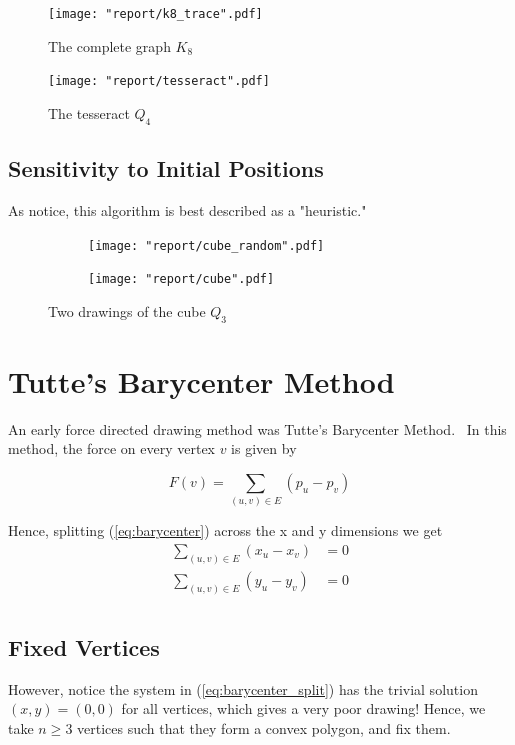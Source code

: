 \documentclass[11pt]{report}
\begin{document}
\begin{figure}[H]
    \centering
    \texttt{[image: "report/k8\_trace".pdf]}
    \caption{The complete graph $K_8$}
\end{figure}

\begin{figure}[H]
    \centering
    \texttt{[image: "report/tesseract".pdf]}
    \caption{The tesseract $Q_4$}
\end{figure}

\subsection{Sensitivity to Initial Positions}
As notice, this algorithm is best described as a "heuristic."   

\begin{figure}[H]
    \begin{subfigure}{.5\linewidth}
    \centering
    \texttt{[image: "report/cube\_random".pdf]}
    \end{subfigure}
    \begin{subfigure}{.5\linewidth}
    \centering
    \texttt{[image: "report/cube".pdf]}
    \end{subfigure}
    \caption{Two drawings of the cube $Q_3$}
\end{figure}

\section{Tutte's Barycenter Method}
An early force directed drawing method was Tutte's Barycenter Method.~\cite{tutte1963draw} In this method, the force on every vertex $v$ is given by 

\begin{equation}\label{eq:barycenter}
F(v) = \sum_{(u, v) \in E} (p_u - p_v)
\end{equation}

Hence, splitting (\ref{eq:barycenter}) across the x and y dimensions we get
\begin{equation}\label{eq:barycenter_split}
    \begin{aligned}
    \sum_{(u, v) \in E} (x_u - x_v) &= 0 \\
    \sum_{(u, v) \in E} (y_u - y_v) &= 0 \\
    \end{aligned}
\end{equation}

\subsection{Fixed Vertices}
However, notice the system in (\ref{eq:barycenter_split}) has the trivial solution $(x, y) = (0, 0)$ for all vertices, which gives a very poor drawing! Hence, we take $n \geq 3$ vertices such that they form a convex polygon, and fix them. \\
\end{document}
